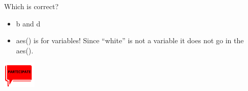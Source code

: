 \documentclass[
  letterpaper,
  DIV=11,
  numbers=noendperiod]{scrreprt}
\providecommand{\tightlist}{%
  \setlength{\itemsep}{0pt}\setlength{\parskip}{0pt}}\usepackage{longtable,booktabs,array}
\begin{document}
\begin{tcolorbox}[enhanced jigsaw, breakable, colback=white, bottomrule=.15mm, leftrule=.75mm, colframe=quarto-callout-important-color-frame, arc=.35mm, rightrule=.15mm, toprule=.15mm, left=2mm, opacityback=0]

Which is correct?

\begin{itemize}
\tightlist
\item
  b and d
\item
  aes() is for variables! Since ``white'' is not a variable it does not
  go in the aes().
\end{itemize}

\includegraphics[width=\textwidth,height=0.5in]{images/images_lecture/participate_icon.png}

\end{tcolorbox}
\end{document}
